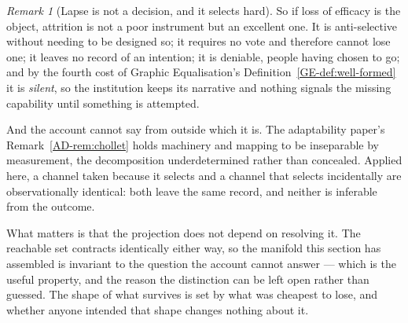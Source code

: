 \documentclass[11pt,a4paper]{article}
\theoremstyle{remark}
\newtheorem{remark}[definition]{Remark}
\begin{document}
\begin{remark}[Lapse is not a decision, and it selects hard]
So if loss of efficacy is the object, attrition is not a poor instrument but an excellent one. It
is anti-selective without needing to be designed so; it requires no vote and therefore cannot lose one;
it leaves no record of an intention; it is deniable, people having chosen to go; and by the fourth cost of
Graphic Equalisation's Definition~\ref{GE-def:well-formed} it is \emph{silent}, so the institution keeps its narrative and nothing signals
the missing capability until something is attempted.

And the account cannot say from outside which it is. The adaptability paper's Remark~\ref{AD-rem:chollet} holds machinery and
mapping to be inseparable by measurement, the decomposition underdetermined rather than concealed.
Applied here, a channel taken because it selects and a channel that selects incidentally are
observationally identical: both leave the same record, and neither is inferable from the outcome.

What matters is that the projection does not depend on resolving it. The reachable set contracts
identically either way, so the manifold this section has assembled is invariant to the question the
account cannot answer --- which is the useful property, and the reason the distinction can be left open
rather than guessed. The shape of what survives is set by what was cheapest to lose, and whether
anyone intended that shape changes nothing about it.
\end{remark}
\end{document}
